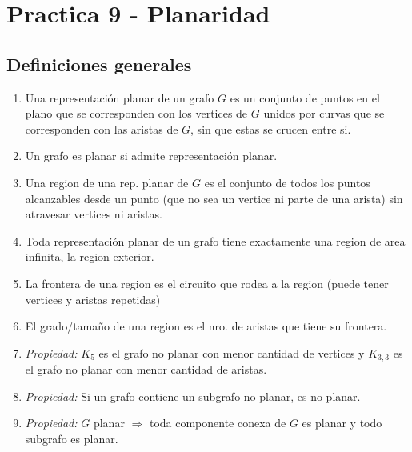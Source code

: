 \section{Practica 9 - Planaridad}
\subsection{Definiciones generales}
\begin{enumerate}
\item Una representación planar de un grafo $G$ es un conjunto de puntos en el plano que se corresponden con los vertices de $G$ unidos por curvas que se corresponden con las aristas de $G$, sin que estas se crucen entre si.
\item Un grafo es planar si admite representación planar.
\item Una region de una rep. planar de $G$ es el conjunto de todos los puntos alcanzables desde un punto (que no sea un vertice ni parte de una arista) sin atravesar vertices ni aristas.
\item Toda representación planar de un grafo tiene exactamente una region de area infinita, la region exterior.
\item La frontera de una region es el circuito que rodea a la region (puede tener vertices y aristas repetidas)
\item El grado/tamaño de una region es el nro. de aristas que tiene su frontera.
\item \textit{Propiedad:} $K_{5}$ es el grafo no planar con menor cantidad de vertices y $K_{3,3}$ es el grafo no planar con menor cantidad de aristas.
\item \textit{Propiedad:} Si un grafo contiene un subgrafo no planar, es no planar.
\item \textit{Propiedad:} $G$ planar $\Rightarrow$ toda componente conexa de $G$ es planar y todo subgrafo es planar.
\end{enumerate}


